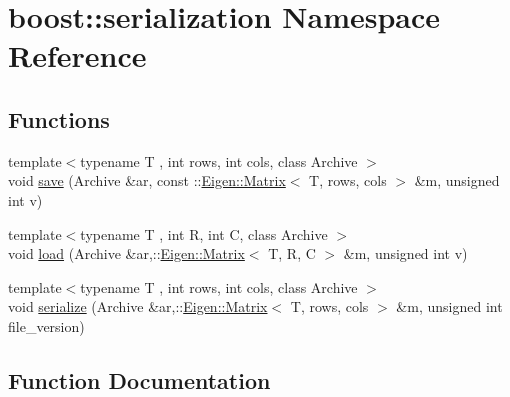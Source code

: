 \hypertarget{namespaceboost_1_1serialization}{}\section{boost\+:\+:serialization Namespace Reference}
\label{namespaceboost_1_1serialization}
\subsection*{Functions}
\begin{DoxyCompactItemize}
\item 
{\footnotesize template$<$typename T , int rows, int cols, class Archive $>$ }\\void \hyperlink{namespaceboost_1_1serialization_aa7021b16faca824017a33df205f44c01}{save} (Archive \&ar, const \+::\hyperlink{test_8cpp_a645222978e81acfb2523a9bce34aecc0}{Eigen\+::\+Matrix}$<$ T, rows, cols $>$ \&m, unsigned int v)
\item 
{\footnotesize template$<$typename T , int R, int C, class Archive $>$ }\\void \hyperlink{namespaceboost_1_1serialization_a76faf89a36520a5181fe7464aec003fe}{load} (Archive \&ar,\+::\hyperlink{test_8cpp_a645222978e81acfb2523a9bce34aecc0}{Eigen\+::\+Matrix}$<$ T, R, C $>$ \&m, unsigned int v)
\item 
{\footnotesize template$<$typename T , int rows, int cols, class Archive $>$ }\\void \hyperlink{namespaceboost_1_1serialization_a5839810cadeccc13a50f63a8cae475a5}{serialize} (Archive \&ar,\+::\hyperlink{test_8cpp_a645222978e81acfb2523a9bce34aecc0}{Eigen\+::\+Matrix}$<$ T, rows, cols $>$ \&m, unsigned int file\+\_\+version)
\end{DoxyCompactItemize}


\subsection{Function Documentation}
